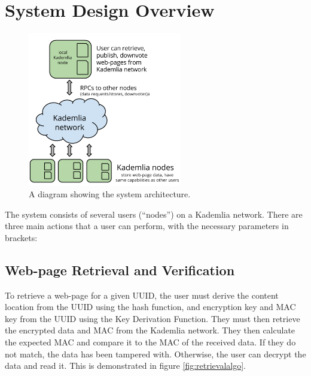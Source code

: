 \section{System Design Overview}

\begin{figure}[H]
    \centering
    \includegraphics[width=0.6\textwidth]{img/arch.png}
    \caption{A diagram showing the system architecture.}
    \label{fig:arch}
\end{figure}

The system consists of several users (``nodes'') on a Kademlia network. There are three main actions that a user can perform,
with the necessary parameters in brackets:

\subsection{Web-page Retrieval and Verification}

To retrieve a web-page for a given UUID, the user must derive the content location from the UUID using the hash function,
and encryption key and MAC key from the UUID using the Key Derivation Function. They must then retrieve the encrypted data
and MAC from the Kademlia network. They then calculate the expected MAC and compare it to the MAC of the received data. If
they do not match, the data has been tampered with. Otherwise, the user can decrypt the data and read it. This is demonstrated in
figure \ref{fig:retrievalalgo}.

